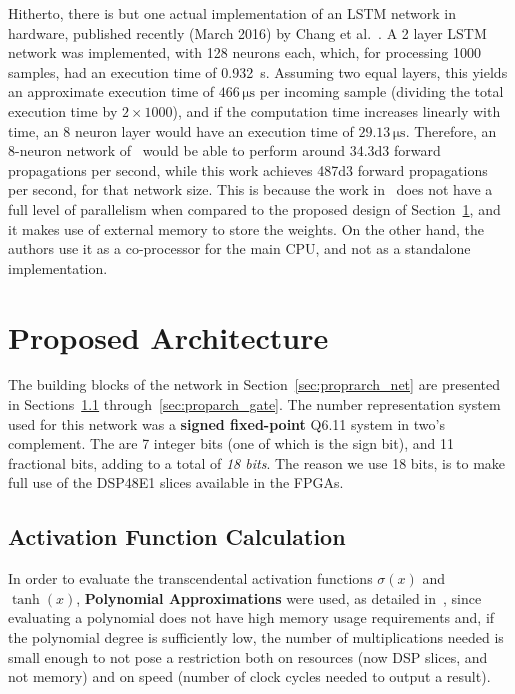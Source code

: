 \documentclass[conference]{IEEEtran}
\begin{document}
Hitherto, there is but one actual implementation of an LSTM network in hardware, published recently
(March 2016) by Chang et al.~\cite{Chang15}. A 2 layer LSTM network was implemented,
with 128 neurons each, which, for processing 1000 samples, had an execution time of \SI{0.932}{\second}. Assuming
two equal layers, this yields an approximate execution time of $466 \, \si{\micro\second}$ per incoming sample (dividing the total execution time by $2 \times 1000$), and
if the computation time increases linearly with time, an 8 neuron layer would have an execution time of $29.13 \, \si{\micro\second}$.
Therefore, an 8-neuron network of~\cite{Chang15} would be able to perform around \num{34.3d3} forward propagations per second, while this work achieves \num{487d3} forward propagations per second, for that network size. This is because the work in~\cite{Chang15} does not have a full level of parallelism when compared to the proposed design of
Section~\ref{sec:proparch}, and it makes use of external memory to store the weights. On the other hand, the authors use it as a co-processor for the main CPU, and not as a
standalone implementation.

\section{Proposed Architecture}\label{sec:proparch}

The building blocks of the network in Section~\ref{sec:proprarch_net} are presented in Sections~\ref{sec:proprarch_af} through~\ref{sec:proparch_gate}.
The number representation system used for this network was a \textbf{signed fixed-point} Q6.11 system in two's complement. The are 7 integer bits (one of which is
the sign bit), and 11 fractional bits, adding to a total of \textit{18 bits}. The reason we use 18 bits, is to make full use of the DSP48E1 slices available
in the FPGAs.

\subsection{Activation Function Calculation}\label{sec:proprarch_af}
In order to evaluate the transcendental activation functions $\sigma(x)$ and $\tanh(x)$, \textbf{Polynomial Approximations} were used, as detailed in~\cite{Muller05},
since evaluating a polynomial does not have high memory usage requirements and, if the polynomial degree is sufficiently low, the
number of multiplications needed is small enough to not pose a restriction both on resources (now DSP slices, and not memory) and on speed (number of clock cycles
needed to output a result).
\end{document}
